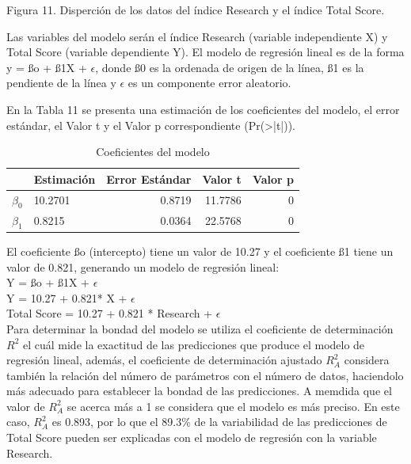 \documentclass[
]{article}
\begin{document}
\begin{multicols}{2}
Figura 11. Disperción de los datos del índice Research y el índice Total Score.

Las variables del modelo serán el índice Research (variable independiente X) y Total Score (variable dependiente Y). El modelo de regresión lineal es de la forma y = ßo + ß1X + $\epsilon$, donde ß0 es la ordenada de origen de la línea, ß1 es la pendiente de la línea y $\epsilon$ es un componente error aleatorio.



En la Tabla 11 se presenta una estimación de los coeficientes del modelo, el error estándar, el Valor t y el Valor p correspondiente (Pr(>|t|)). 

\begin{table}[H]
\centering
\caption{\label{tab:tabla11}Coeficientes del modelo}
\centering
\fontsize{9}{11}\selectfont
\begin{tabular}[t]{llrrr}
\toprule
  & Estimación & Error Estándar & Valor t & Valor p\\
\midrule
$\beta_0$ & 10.2701 & 0.8719 & 11.7786 & 0\\
$\beta_1$ & 0.8215 & 0.0364 & 22.5768 & 0\\
\bottomrule
\end{tabular}
\end{table}

El coeficiente ßo (intercepto) tiene un valor de  10.27 y el coeficiente ß1 tiene un valor de 0.821, generando un modelo de regresión lineal:\\

Y = ßo + ß1X + $\epsilon$\\
Y = 10.27 + 0.821* X + $\epsilon$\\
Total Score = 10.27 + 0.821 * Research + $\epsilon$\\

Para determinar la bondad del modelo se utiliza el coeficiente de determinación $R^2$ el cuál mide la exactitud de las predicciones que produce el modelo de regresión lineal, además, el coeficiente de determinación ajustado $R^2_{A}$ considera también la relación del número de parámetros con el número de datos, haciendolo más adecuado para establecer la bondad de las predicciones. A memdida que el valor de $R^2_{A}$ se acerca más a 1 se considera que el modelo es más preciso. En este caso, $R^2_{A}$ es 0.893, por lo que el 89.3\% de la variabilidad de las predicciones de Total Score pueden ser explicadas con el modelo de regresión con la variable Research.




\end{multicols}
\end{document}

